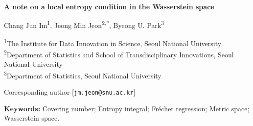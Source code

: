 \documentclass[11pt]{article}
\numberwithin{equation}{section}
\begin{document}
\begin{center}
{\Large\bfseries A note on a local entropy condition in the Wasserstein space \par}

\vspace{1em}

Chang Jun Im\textsuperscript{1},
Jeong Min Jeon\textsuperscript{2,*},
Byeong U. Park\textsuperscript{3}

\vspace{0.75em}

{\small
\textsuperscript{1}The Institute for Data Innovation in Science, Seoul National University\\
\textsuperscript{2}Department of Statistics and School of Transdisciplinary Innovations, Seoul National University\\
\textsuperscript{3}Department of Statistics, Seoul National University
}

\vspace{0.75em}

{\small *Corresponding author [\texttt{jm.jeon@snu.ac.kr}]}
\end{center}

\vspace{1em}

\begin{abstract}
Entropy conditions are widely used in empirical-process analyses to establish asymptotic properties of M-estimators. In regression problems with responses taking values in a general metric space, a commonly imposed condition requires the entropy integral associated with a shrinking ball centered at the target object to remain uniformly bounded as the ball radius tends to zero. We show that this condition generally fails in the quadratic Wasserstein space of univariate probability distributions supported on a compact interval. Specifically, when the target object is a strictly increasing and absolutely continuous distribution function whose derivative is bounded away from zero and infinity, the corresponding entropy integral diverges as the ball radius tends to zero. The same divergence persists even when the ambient space is restricted to the class of distribution functions satisfying fixed uniform two-sided Lipschitz bounds. These results indicate that different asymptotic analyses are required for the quadratic Wasserstein space.
\end{abstract}

\noindent\textbf{Keywords:}
Covering number; Entropy integral; Fr\'echet regression; Metric space; Wasserstein space.
\end{document}
